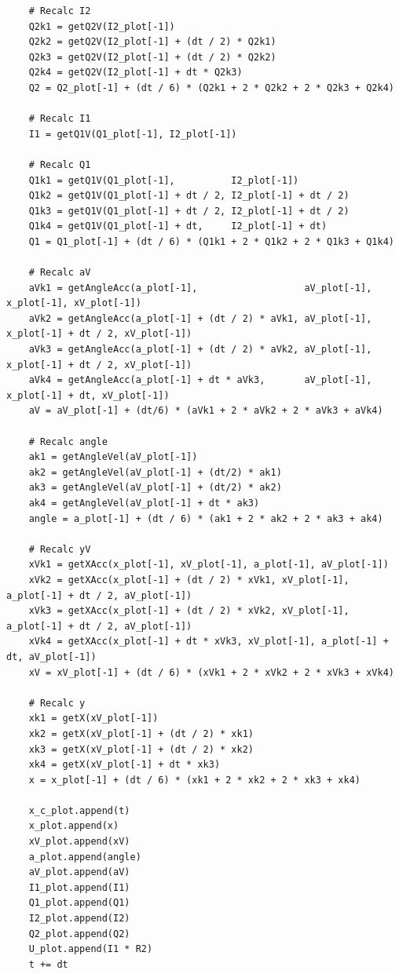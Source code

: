 \documentclass[a4paper,14pt]{extarticle}
\begin{document}
\begin{verbatim}
    # Recalc I2
    Q2k1 = getQ2V(I2_plot[-1])
    Q2k2 = getQ2V(I2_plot[-1] + (dt / 2) * Q2k1)
    Q2k3 = getQ2V(I2_plot[-1] + (dt / 2) * Q2k2)
    Q2k4 = getQ2V(I2_plot[-1] + dt * Q2k3)
    Q2 = Q2_plot[-1] + (dt / 6) * (Q2k1 + 2 * Q2k2 + 2 * Q2k3 + Q2k4)

    # Recalc I1
    I1 = getQ1V(Q1_plot[-1], I2_plot[-1])

    # Recalc Q1
    Q1k1 = getQ1V(Q1_plot[-1],          I2_plot[-1])
    Q1k2 = getQ1V(Q1_plot[-1] + dt / 2, I2_plot[-1] + dt / 2)
    Q1k3 = getQ1V(Q1_plot[-1] + dt / 2, I2_plot[-1] + dt / 2)
    Q1k4 = getQ1V(Q1_plot[-1] + dt,     I2_plot[-1] + dt)
    Q1 = Q1_plot[-1] + (dt / 6) * (Q1k1 + 2 * Q1k2 + 2 * Q1k3 + Q1k4)

    # Recalc aV
    aVk1 = getAngleAcc(a_plot[-1],                   aV_plot[-1], x_plot[-1], xV_plot[-1])
    aVk2 = getAngleAcc(a_plot[-1] + (dt / 2) * aVk1, aV_plot[-1], x_plot[-1] + dt / 2, xV_plot[-1])
    aVk3 = getAngleAcc(a_plot[-1] + (dt / 2) * aVk2, aV_plot[-1], x_plot[-1] + dt / 2, xV_plot[-1])
    aVk4 = getAngleAcc(a_plot[-1] + dt * aVk3,       aV_plot[-1], x_plot[-1] + dt, xV_plot[-1])
    aV = aV_plot[-1] + (dt/6) * (aVk1 + 2 * aVk2 + 2 * aVk3 + aVk4)

    # Recalc angle
    ak1 = getAngleVel(aV_plot[-1])
    ak2 = getAngleVel(aV_plot[-1] + (dt/2) * ak1)
    ak3 = getAngleVel(aV_plot[-1] + (dt/2) * ak2)
    ak4 = getAngleVel(aV_plot[-1] + dt * ak3)
    angle = a_plot[-1] + (dt / 6) * (ak1 + 2 * ak2 + 2 * ak3 + ak4)

    # Recalc yV
    xVk1 = getXAcc(x_plot[-1], xV_plot[-1], a_plot[-1], aV_plot[-1])
    xVk2 = getXAcc(x_plot[-1] + (dt / 2) * xVk1, xV_plot[-1], a_plot[-1] + dt / 2, aV_plot[-1])
    xVk3 = getXAcc(x_plot[-1] + (dt / 2) * xVk2, xV_plot[-1], a_plot[-1] + dt / 2, aV_plot[-1])
    xVk4 = getXAcc(x_plot[-1] + dt * xVk3, xV_plot[-1], a_plot[-1] + dt, aV_plot[-1])
    xV = xV_plot[-1] + (dt / 6) * (xVk1 + 2 * xVk2 + 2 * xVk3 + xVk4)

    # Recalc y
    xk1 = getX(xV_plot[-1])
    xk2 = getX(xV_plot[-1] + (dt / 2) * xk1)
    xk3 = getX(xV_plot[-1] + (dt / 2) * xk2)
    xk4 = getX(xV_plot[-1] + dt * xk3)
    x = x_plot[-1] + (dt / 6) * (xk1 + 2 * xk2 + 2 * xk3 + xk4)

    x_c_plot.append(t)
    x_plot.append(x)
    xV_plot.append(xV)
    a_plot.append(angle)
    aV_plot.append(aV)
    I1_plot.append(I1)
    Q1_plot.append(Q1)
    I2_plot.append(I2)
    Q2_plot.append(Q2)
    U_plot.append(I1 * R2)
    t += dt


\end{verbatim}
\end{document}
